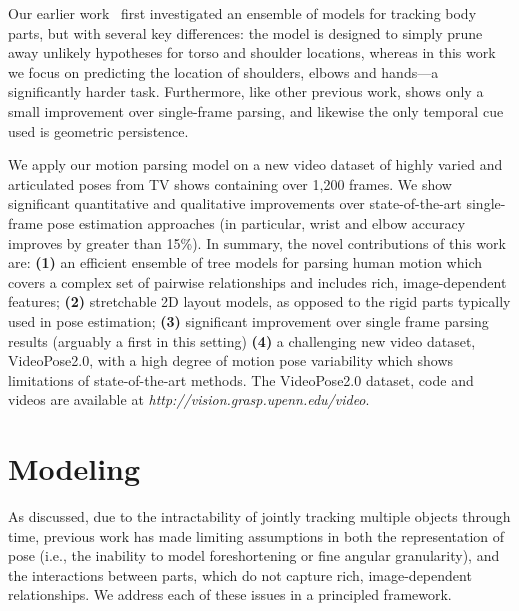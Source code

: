 
Our earlier work~\cite{weisssapp10} first investigated an ensemble of models 
for tracking body parts, but with several key differences: the model is 
designed to simply prune away unlikely hypotheses for torso and shoulder
locations, whereas in this work we focus on predicting the location of 
shoulders, elbows and hands---a significantly harder task.  Furthermore, like 
other previous work, \cite{weisssapp10} shows only a small improvement over 
single-frame parsing, and likewise the only temporal cue used is geometric persistence.



We apply our motion parsing model on a new video dataset of highly varied and 
articulated poses from TV shows containing over 1,200 frames.  We show 
significant quantitative and qualitative improvements over state-of-the-art 
single-frame pose estimation approaches (in particular, wrist and elbow 
accuracy improves by greater than 15\%).  In summary, the novel contributions 
of this work are: \textbf{(1)} an efficient ensemble of tree models for parsing 
human motion which covers a complex set of pairwise relationships and includes 
rich, image-dependent features; \textbf{(2)} stretchable 2D layout models, as 
opposed to the rigid parts typically used in pose estimation;
\textbf{(3)} significant improvement over single frame parsing results 
(arguably a first in this setting) \textbf{(4)} a challenging new video dataset, VideoPose2.0, 
with a high degree of motion pose variability which shows limitations of 
state-of-the-art methods.  The VideoPose2.0 dataset, code and videos are available at 
\textit{http://vision.grasp.upenn.edu/video}.



\section{Modeling}\label{sec:model}
As discussed, due to the intractability of jointly tracking multiple objects through time, previous 
work has made limiting assumptions in both the representation of pose (i.e., 
the inability to model foreshortening or fine angular granularity), and the 
interactions between parts, which do not capture rich, image-dependent 
relationships.  We address each of these issues in a principled framework.

